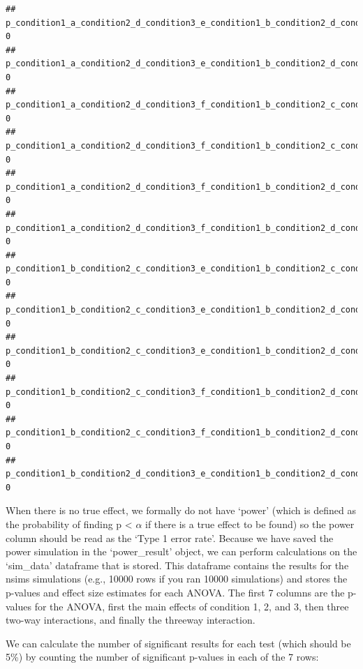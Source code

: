 \documentclass[]{book}
\newenvironment{Shaded}{\begin{snugshade}}{\end{snugshade}}
\newcommand{\ControlFlowTok}[1]{\textcolor[rgb]{0.13,0.29,0.53}{\textbf{#1}}}
\newcommand{\DecValTok}[1]{\textcolor[rgb]{0.00,0.00,0.81}{#1}}
\newcommand{\KeywordTok}[1]{\textcolor[rgb]{0.13,0.29,0.53}{\textbf{#1}}}
\newcommand{\NormalTok}[1]{#1}
\newcommand{\OperatorTok}[1]{\textcolor[rgb]{0.81,0.36,0.00}{\textbf{#1}}}
\newcommand{\StringTok}[1]{\textcolor[rgb]{0.31,0.60,0.02}{#1}}
\begin{document}
\begin{verbatim}
## p_condition1_a_condition2_d_condition3_e_condition1_b_condition2_d_condition3_e           0
## p_condition1_a_condition2_d_condition3_e_condition1_b_condition2_d_condition3_f           0
## p_condition1_a_condition2_d_condition3_f_condition1_b_condition2_c_condition3_e           0
## p_condition1_a_condition2_d_condition3_f_condition1_b_condition2_c_condition3_f           0
## p_condition1_a_condition2_d_condition3_f_condition1_b_condition2_d_condition3_e           0
## p_condition1_a_condition2_d_condition3_f_condition1_b_condition2_d_condition3_f           0
## p_condition1_b_condition2_c_condition3_e_condition1_b_condition2_c_condition3_f           0
## p_condition1_b_condition2_c_condition3_e_condition1_b_condition2_d_condition3_e           0
## p_condition1_b_condition2_c_condition3_e_condition1_b_condition2_d_condition3_f           0
## p_condition1_b_condition2_c_condition3_f_condition1_b_condition2_d_condition3_e           0
## p_condition1_b_condition2_c_condition3_f_condition1_b_condition2_d_condition3_f           0
## p_condition1_b_condition2_d_condition3_e_condition1_b_condition2_d_condition3_f           0
\end{verbatim}

When there is no true effect, we formally do not have `power' (which is defined as the probability of finding p \textless{} \(\alpha\) if there is a true effect to be found) so the power column should be read as the `Type 1 error rate'. Because we have saved the power simulation in the `power\_result' object, we can perform calculations on the `sim\_data' dataframe that is stored. This dataframe contains the results for the nsims simulations (e.g., 10000 rows if you ran 10000 simulations) and stores the p-values and effect size estimates for each ANOVA. The first 7 columns are the p-values for the ANOVA, first the main effects of condition 1, 2, and 3, then three two-way interactions, and finally the threeway interaction.

We can calculate the number of significant results for each test (which should be 5\%) by counting the number of significant p-values in each of the 7 rows:

\begin{Shaded}
\end{Shaded}
\end{document}
